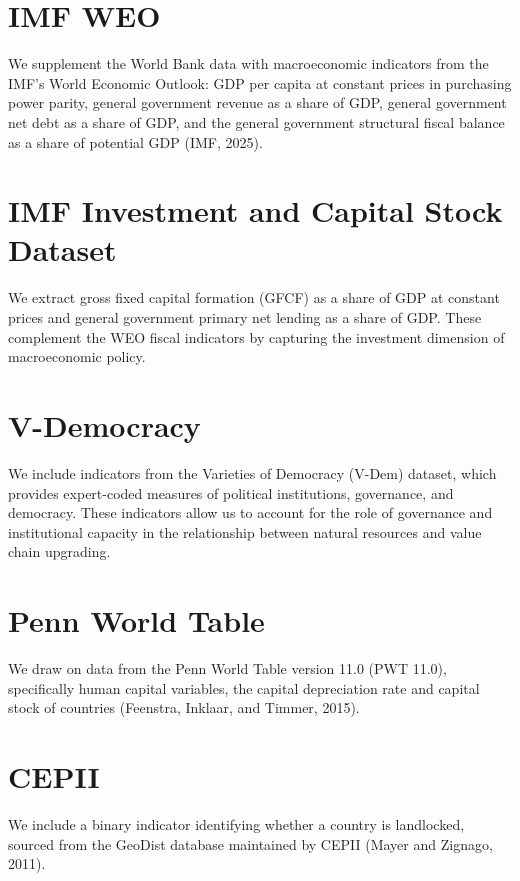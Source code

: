 \documentclass[12pt,a4paper]{report}
\begin{document}
\begin{appendices}
\section{IMF WEO}

We supplement the World Bank data with macroeconomic indicators from the IMF's World Economic Outlook: GDP per capita at constant prices in purchasing power parity, general government revenue as a share of GDP, general government net debt as a share of GDP, and the general government structural fiscal balance as a share of potential GDP (IMF, 2025).

\section{IMF Investment and Capital Stock Dataset}

We extract gross fixed capital formation (GFCF) as a share of GDP at constant prices and general government primary net lending as a share of GDP. These complement the WEO fiscal indicators by capturing the investment dimension of macroeconomic policy.

\section{V-Democracy}

We include indicators from the Varieties of Democracy (V-Dem) dataset, which provides expert-coded measures of political institutions, governance, and democracy. These indicators allow us to account for the role of governance and institutional capacity in the relationship between natural resources and value chain upgrading.

\section{Penn World Table}

We draw on data from the Penn World Table version 11.0 (PWT 11.0), specifically human capital variables, the capital depreciation rate and capital stock of countries (Feenstra, Inklaar, and Timmer, 2015).

\section{CEPII}

We include a binary indicator identifying whether a country is landlocked, sourced from the GeoDist database maintained by CEPII (Mayer and Zignago, 2011).


\end{appendices}
\end{document}

